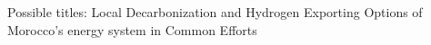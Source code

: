 Possible titles:
Local Decarbonization and Hydrogen Exporting Options of Morocco's energy system in Common Efforts